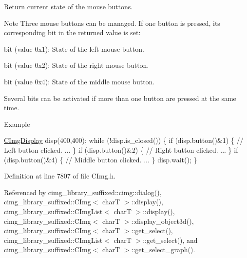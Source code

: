 Return current state of the mouse buttons. 

\begin{DoxyNote}{Note}
Three mouse buttons can be managed. If one button is pressed, its corresponding bit in the returned value is set\+:
\begin{DoxyItemize}
\item bit {} (value {\ttfamily 0x1})\+: State of the left mouse button.
\item bit {} (value {\ttfamily 0x2})\+: State of the right mouse button.
\item bit {} (value {\ttfamily 0x4})\+: State of the middle mouse button.
\end{DoxyItemize}
\end{DoxyNote}
Several bits can be activated if more than one button are pressed at the same time. \begin{DoxyParagraph}{Example}

\begin{DoxyCode}
\hyperlink{structcimg__library__suffixed_1_1CImgDisplay_a7716ca9a49ff94123b3417556bf4ce49}{CImgDisplay} disp(400,400);
\textcolor{keywordflow}{while} (!disp.is\_closed()) \{
  \textcolor{keywordflow}{if} (disp.button()&1) \{ \textcolor{comment}{// Left button clicked.}
    ...
  \}
  \textcolor{keywordflow}{if} (disp.button()&2) \{ \textcolor{comment}{// Right button clicked.}
    ...
  \}
  \textcolor{keywordflow}{if} (disp.button()&4) \{ \textcolor{comment}{// Middle button clicked.}
    ...
  \}
  disp.wait();
\}
\end{DoxyCode}
 
\end{DoxyParagraph}


Definition at line 7807 of file C\+Img.\+h.



Referenced by cimg\+\_\+library\+\_\+suffixed\+::cimg\+::dialog(), cimg\+\_\+library\+\_\+suffixed\+::\+C\+Img$<$ char\+T $>$\+::display(), cimg\+\_\+library\+\_\+suffixed\+::\+C\+Img\+List$<$ char\+T $>$\+::display(), cimg\+\_\+library\+\_\+suffixed\+::\+C\+Img$<$ char\+T $>$\+::display\+\_\+object3d(), cimg\+\_\+library\+\_\+suffixed\+::\+C\+Img$<$ char\+T $>$\+::get\+\_\+select(), cimg\+\_\+library\+\_\+suffixed\+::\+C\+Img\+List$<$ char\+T $>$\+::get\+\_\+select(), and cimg\+\_\+library\+\_\+suffixed\+::\+C\+Img$<$ char\+T $>$\+::get\+\_\+select\+\_\+graph().

